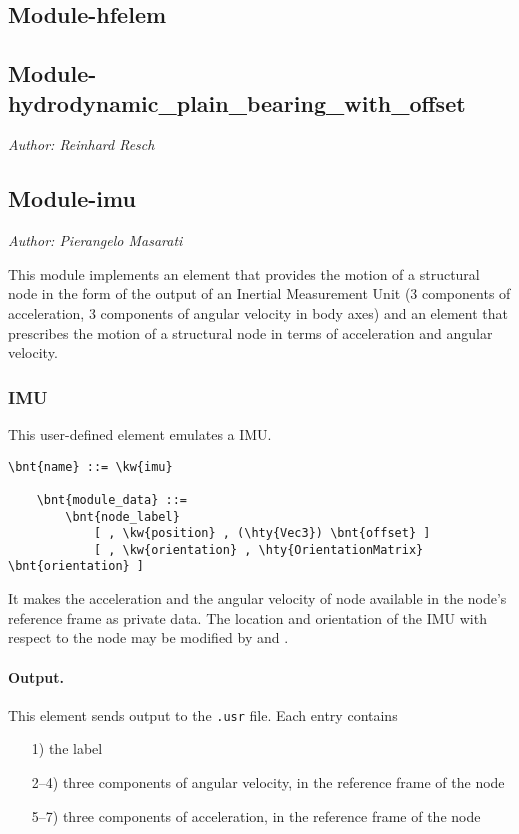 \subsection{Module-hfelem}




\subsection{Module-hydrodynamic\_plain\_bearing\_with\_offset}
\emph{Author: Reinhard Resch}




\subsection{Module-imu}
\emph{Author: Pierangelo Masarati}

\noindent
This module implements an element that provides the motion of a structural node
in the form of the output of an Inertial Measurement Unit
(3 components of acceleration, 3 components of angular velocity in body axes)
and an element that prescribes the motion of a structural node
in terms of acceleration and angular velocity.

\subsubsection{IMU}
This user-defined element emulates a IMU.
\begin{Verbatim}[commandchars=\\\{\}]
    \bnt{name} ::= \kw{imu}

    \bnt{module_data} ::=
        \bnt{node_label}
            [ , \kw{position} , (\hty{Vec3}) \bnt{offset} ]
            [ , \kw{orientation} , \hty{OrientationMatrix} \bnt{orientation} ]
\end{Verbatim}
It makes the acceleration and the angular velocity of node 
available in the node's reference frame as private data.
The location and orientation of the IMU with respect to the node may be modified
by  and .

\paragraph{Output.}
This element sends output to the \texttt{.usr} file.
Each entry contains
\begin{itemize}
\item[1)] the label
\item[2--4)] three components of angular velocity, in the reference frame of the node
\item[5--7)] three components of acceleration, in the reference frame of the node
\end{itemize}

